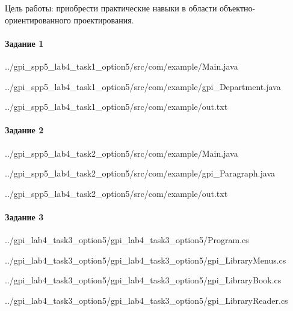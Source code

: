 Цель работы:
приобрести практические навыки в области объектно-ориентированного проектирования.


\paragraph{Задание 1} \hspace{0pt}


{../gpi_spp5_lab4_task1_option5/src/com/example/Main.java}


{../gpi_spp5_lab4_task1_option5/src/com/example/gpi_Department.java}


{../gpi_spp5_lab4_task1_option5/src/com/example/out.txt}



\paragraph{Задание 2} \hspace{0pt}


{../gpi_spp5_lab4_task2_option5/src/com/example/Main.java}


{../gpi_spp5_lab4_task2_option5/src/com/example/gpi_Paragraph.java}\


{../gpi_spp5_lab4_task2_option5/src/com/example/out.txt}



\paragraph{Задание 3} \hspace{0pt}


{../gpi_lab4_task3_option5/gpi_lab4_task3_option5/Program.cs}


{../gpi_lab4_task3_option5/gpi_lab4_task3_option5/gpi_LibraryMenus.cs}


{../gpi_lab4_task3_option5/gpi_lab4_task3_option5/gpi_LibraryBook.cs}


{../gpi_lab4_task3_option5/gpi_lab4_task3_option5/gpi_LibraryReader.cs}

\newpage
